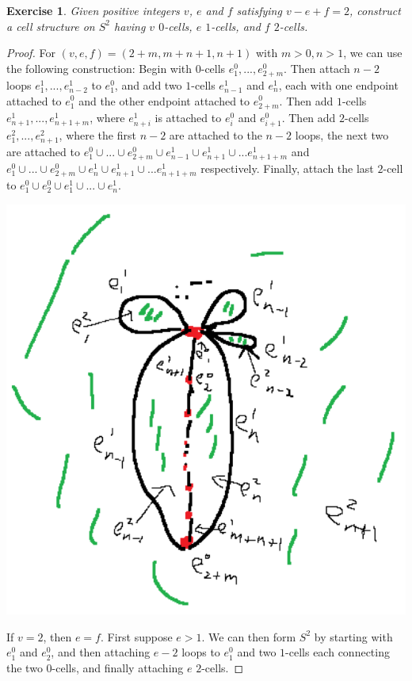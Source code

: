 \documentclass{article}
\newtheorem{exercise}[theorem]{Exercise}
\begin{document}
\begin{exercise}
Given positive integers $v$, $e$ and $f$ satisfying $v-e+f=2$, construct a cell structure on $S^2$ having $v$ $0$-cells, $e$ $1$-cells, and $f$ $2$-cells.
\end{exercise}
\begin{proof}
For $(v,e,f)=(2+m,m+n+1,n+1)$ with $m>0,n>1$, we can use the following construction: Begin with $0$-cells $e_1^0,...,e_{2+m}^0$. Then attach $n-2$ loops $e_1^1,...,e_{n-2}^1$ to $e_1^0$, and add two $1$-cells $e_{n-1}^1$ and $e_n^1$, each with one endpoint attached to $e_1^0$ and the other endpoint attached to $e_{2+m}^0$. Then add $1$-cells $e_{n+1}^1,...,e_{n+1+m}^1$, where $e_{n+i}^1$ is attached to $e_i^0$ and $e_{i+1}^0$. Then add $2$-cells $e_1^2,...,e_{n+1}^2$, where the first $n-2$ are attached to the $n-2$ loops, the next two are attached to $e_1^0\cup...\cup e_{2+m}^0\cup e_{n-1}^1\cup e_{n+1}^1\cup...e_{n+1+m}^1$ and $e_1^0\cup...\cup e_{2+m}^0\cup e_n^1\cup e_{n+1}^1\cup...e_{n+1+m}^1$ respectively. Finally, attach the last $2$-cell to $e_1^0\cup e_2^0\cup e_1^1\cup...\cup e_n^1$.

\includegraphics[scale=0.5]{Screenshot (1340).png}

If $v=2$, then $e=f$. First suppose $e>1$. We can then form $S^2$ by starting with $e_1^0$ and $e_2^0$, and then attaching $e-2$ loops to $e_1^0$ and two $1$-cells each connecting the two $0$-cells, and finally attaching $e$ $2$-cells.


\end{proof}
\end{document}
